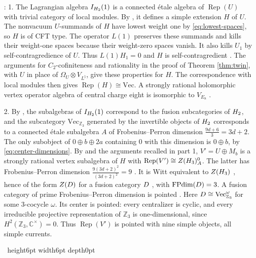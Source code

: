 \documentclass[leqno]{article}
\newcommand{\Cbb}{\ensuremath{\mathbb{C}}}
\let\cal\relax
\newcommand{\cal}{\mathcal}
\newcommand{\Z}{\ensuremath{\mathbb{Z}}}
\newcommand{\qed}{\hfill \vrule height6pt  width6pt depth0pt}
\newcommand{\ot}{\otimes}
\DeclareMathOperator{\Rep}{Rep}
\newenvironment{proof}[1][]{\noindent {\it Proof #1} : }{\hbox{~}\qed
\smallskip
}
\numberwithin{equation}{section}
\begin{document}
\begin{proof}
1. The Lagrangian algebra $I_{\cal H_2}(1)$ is a connected étale algebra of $\Rep(U)$ with trivial category of local modules. By \cite{HKL15,CKM22}, it defines a simple extension $H$ of $U$. The nonvacuum $U$-summands of $H$ have lowest weight one by \eqref{eq:lowest-spaces}, so $H$ is of CFT type. The operator $L(1)$ preserves these summands and kills their weight-one spaces because their weight-zero spaces vanish. It also kills $U_1$ by self-contragredience of $U$. Thus $L(1)H_1=0$ and $H$ is self-contragredient \cite{Li94}. The arguments for $C_2$-cofiniteness and rationality in the proof of Theorem \ref{thm:twin}, with $U$ in place of $\Omega_U \ot V_{L^\natural}$, give these properties for $H$. The correspondence with local modules then gives $\Rep(H) \cong \mathrm{Vec}$. A strongly rational holomorphic vertex operator algebra of central charge eight is isomorphic to $V_{E_8}$ \cite[Theorem 1 p.~2]{DoM04b}.

2. By \cite[Theorem 4.10 p.~18]{DMNO13}, the subalgebras of $I_{\cal H_2}(1)$ correspond to the fusion subcategories of $\cal H_2$, and the subcategory $\mathrm{Vec}_{\Z_3}$ generated by the invertible objects of $\cal H_2$ corresponds to a connected étale subalgebra $A$ of Frobenius--Perron dimension $\frac{9d+6}{3} = 3d+2$. The only subobject of $0 \oplus b \oplus 2a$ containing $0$ with this dimension is $0 \oplus b$, by \eqref{eq:center-dimensions}. By \cite{HKL15} and the arguments recalled in part 1, $V' = U \oplus M_b$ is a strongly rational vertex subalgebra of $H$ with $\Rep(V') \cong Z(\cal H_3)^0_A$. The latter has Frobenius--Perron dimension $\frac{9(3d+2)^2}{(3d+2)^2} = 9$ \cite[Corollary 3.32 p.~15]{DMNO13}. It is Witt equivalent to $Z(\cal H_3)$ \cite[Proposition 5.4 p.~22]{DMNO13}, hence of the form $Z(\cal D)$ for a fusion category $\cal D$ \cite[Proposition 5.8 p.~23]{DMNO13}, with $\operatorname{FPdim}(\cal D) = 3$. A fusion category of prime Frobenius--Perron dimension is pointed \cite[Corollary 8.30]{ENO05}. Here $\cal D \cong \mathrm{Vec}_{\Z_3}^{\omega}$ for some $3$-cocycle $\omega$. Its center is pointed: every centralizer is cyclic, and every irreducible projective representation of $\Z_3$ is one-dimensional, since $H^2(\Z_3,\Cbb^\times) = 0$. Thus $\Rep(V')$ is pointed with nine simple objects, all simple currents.


\end{proof}
\end{document}
